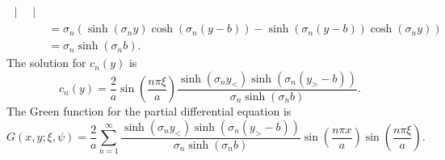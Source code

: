 {\begin{Solution}
\begin{align*}
\begin{vmatrix}
    \end{vmatrix} \\
    &= \sigma_n \left( \sinh(\sigma_n y) \cosh( \sigma_n (y-b) )
      - \sinh( \sigma_n (y-b)) \cosh( \sigma_n y ) \right) \\
    &= \sigma_n \sinh( \sigma_n b ).
  \end{align*}
  The solution for $c_n(y)$ is
  \[
  c_n(y) = \frac{2}{a} \sin \left( \frac{n \pi \xi}{a} \right) 
  \frac{ \sinh(\sigma_n y_<) \sinh(\sigma_n (y_>-b)) }
  { \sigma_n \sinh( \sigma_n b ) }.
  \]
  The Green function for the partial differential equation is
  \[
  \boxed{
    G(x,y;\xi,\psi) = \frac{2}{a} \sum_{n = 1}^\infty 
    \frac{ \sinh(\sigma_n y_<) \sinh(\sigma_n(y_>-b)) }
    { \sigma_n \sinh(\sigma_n b) }
    \sin \left( \frac{n \pi x}{a} \right)
    \sin \left( \frac{n \pi \xi}{a} \right).
    }
  \]
\end{Solution}



}
